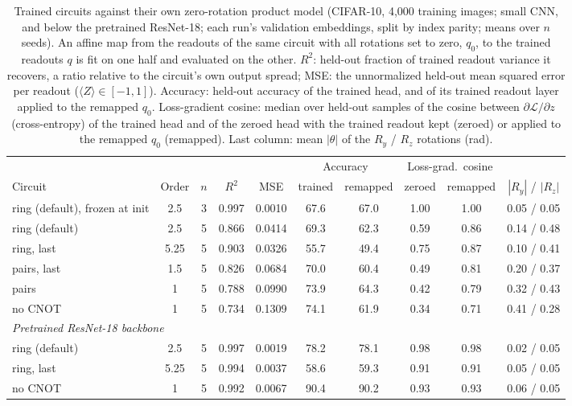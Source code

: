 \begin{table}[h]
\centering
\caption{Trained circuits against their own zero-rotation product model (CIFAR-10, 4,000
training images; small CNN, and below the pretrained ResNet-18; each run's validation embeddings, split by index parity; means over $n$
seeds). An affine map from the readouts of the same circuit with all rotations set to zero,
$q_0$, to the trained readouts $q$ is fit on one half and evaluated on the other. $R^2$:
held-out fraction of trained readout variance it recovers, a ratio relative to the circuit's
own output spread; MSE: the unnormalized held-out mean squared error per readout
($\langle Z\rangle\in[-1,1]$). Accuracy: held-out accuracy of the
trained head, and of its trained readout layer applied to the remapped $q_0$. Loss-gradient
cosine: median over held-out samples of the cosine between $\partial\mathcal{L}/\partial z$
(cross-entropy) of the trained head and of the zeroed head with the trained readout kept
(zeroed) or applied to the remapped $q_0$ (remapped). Last column: mean $|\theta|$ of the
$R_y$ / $R_z$ rotations (rad).}
\label{tab:zeroangle}
\small
\setlength{\tabcolsep}{4pt}
\begin{tabular}{lccccccccc}
\toprule
& & & & & \multicolumn{2}{c}{Accuracy} & \multicolumn{2}{c}{Loss-grad.\ cosine} & \\
\cmidrule(lr){6-7}\cmidrule(lr){8-9}
Circuit & Order & $n$ & $R^2$ & MSE & trained & remapped & zeroed & remapped & $|R_y|$ / $|R_z|$ \\
\midrule
ring (default), frozen at init & 2.5 & 3 & 0.997 & 0.0010 & 67.6 & 67.0 & 1.00 & 1.00 & 0.05 / 0.05 \\
ring (default) & 2.5 & 5 & 0.866 & 0.0414 & 69.3 & 62.3 & 0.59 & 0.86 & 0.14 / 0.48 \\
ring, last & 5.25 & 5 & 0.903 & 0.0326 & 55.7 & 49.4 & 0.75 & 0.87 & 0.10 / 0.41 \\
pairs, last & 1.5 & 5 & 0.826 & 0.0684 & 70.0 & 60.4 & 0.49 & 0.81 & 0.20 / 0.37 \\
pairs & 1 & 5 & 0.788 & 0.0990 & 73.9 & 64.3 & 0.42 & 0.79 & 0.32 / 0.43 \\
no CNOT & 1 & 5 & 0.734 & 0.1309 & 74.1 & 61.9 & 0.34 & 0.71 & 0.41 / 0.28 \\
\midrule
\multicolumn{10}{l}{\emph{Pretrained ResNet-18 backbone}} \\
ring (default) & 2.5 & 5 & 0.997 & 0.0019 & 78.2 & 78.1 & 0.98 & 0.98 & 0.02 / 0.05 \\
ring, last & 5.25 & 5 & 0.994 & 0.0037 & 58.6 & 59.3 & 0.91 & 0.91 & 0.05 / 0.05 \\
no CNOT & 1 & 5 & 0.992 & 0.0067 & 90.4 & 90.2 & 0.93 & 0.93 & 0.06 / 0.05 \\
\bottomrule
\end{tabular}
\end{table}
